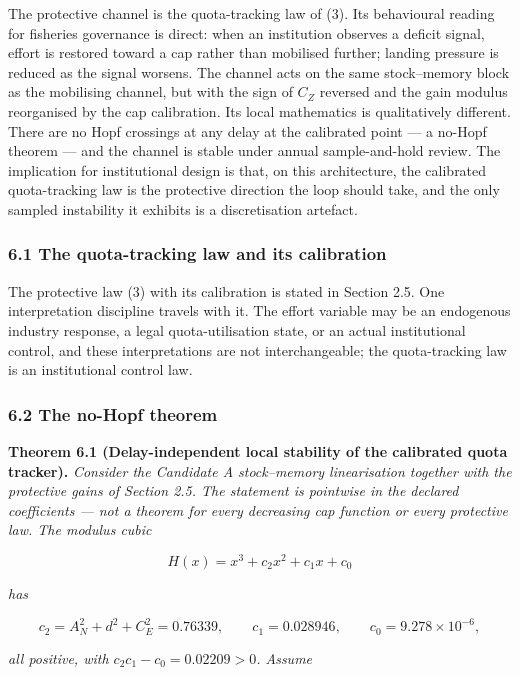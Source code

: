 \documentclass[11pt]{article}
\begin{document}
The protective channel is the quota-tracking law of (3). Its behavioural
reading for fisheries governance is direct: when an institution observes
a deficit signal, effort is restored toward a cap rather than mobilised
further; landing pressure is reduced as the signal worsens. The channel
acts on the same stock--memory block as the mobilising channel, but with
the sign of \(C_Z\) reversed and the gain modulus reorganised by the cap
calibration. Its local mathematics is qualitatively different. There are
no Hopf crossings at any delay at the calibrated point --- a no-Hopf
theorem --- and the channel is stable under annual sample-and-hold
review. The implication for institutional design is that, on this
architecture, the calibrated quota-tracking law is the protective
direction the loop should take, and the only sampled instability it
exhibits is a discretisation artefact.

\subsubsection{6.1 The quota-tracking law and its
calibration}\label{the-quota-tracking-law-and-its-calibration}

The protective law (3) with its calibration is stated in Section 2.5.
One interpretation discipline travels with it. The effort variable may
be an endogenous industry response, a legal quota-utilisation state, or
an actual institutional control, and these interpretations are not
interchangeable; the quota-tracking law is an institutional control law.

\subsubsection{6.2 The no-Hopf theorem}\label{the-no-hopf-theorem}

\textbf{Theorem 6.1 (Delay-independent local stability of the calibrated
quota tracker).} \emph{Consider the Candidate A stock--memory
linearisation together with the protective gains of Section 2.5. The
statement is pointwise in the declared coefficients --- not a theorem
for every decreasing cap function or every protective law. The modulus
cubic}

\[H(x) = x^3 + c_2 x^2 + c_1 x + c_0\]

\emph{has}

\[c_2 = A_N^2 + d^2 + C_E^2 = 0.76339, \qquad c_1 = 0.028946, \qquad c_0 = 9.278\times10^{-6},\]

\emph{all positive, with \(c_2 c_1 - c_0 = 0.02209 > 0\). Assume}
\end{document}

